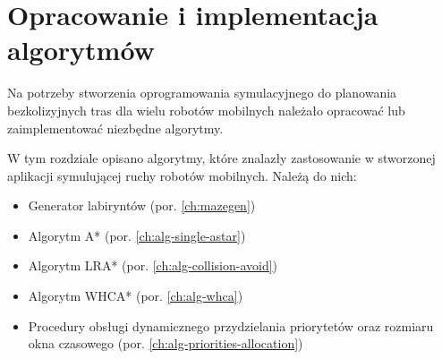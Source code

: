 \chapter{Opracowanie i implementacja algorytmów}
\label{ch:alg-impl}

Na potrzeby stworzenia oprogramowania symulacyjnego do planowania bezkolizyjnych tras dla wielu robotów mobilnych należało opracować lub zaimplementować niezbędne algorytmy.

W tym rozdziale opisano algorytmy, które znalazły zastosowanie w stworzonej aplikacji symulującej ruchy robotów mobilnych. Należą do nich:
\begin{itemize}
	\item Generator labiryntów (por. \ref{ch:mazegen})
	\item Algorytm A* (por. \ref{ch:alg-single-astar})
	\item Algorytm LRA* (por. \ref{ch:alg-collision-avoid})
	\item Algorytm WHCA* (por. \ref{ch:alg-whca})
	\item Procedury obsługi dynamicznego przydzielania priorytetów oraz rozmiaru okna czasowego (por. \ref{ch:alg-priorities-allocation})
\end{itemize}

